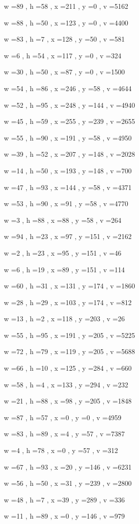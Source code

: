 \documentclass[11pt]{article}
\begin{document}
w =89 , h =58 , x =211 , y =0 , v =5162
\par
w =88 , h =50 , x =123 , y =0 , v =4400
\par
w =83 , h =7 , x =128 , y =50 , v =581
\par
w =6 , h =54 , x =117 , y =0 , v =324
\par
w =30 , h =50 , x =87 , y =0 , v =1500
\par
w =54 , h =86 , x =246 , y =58 , v =4644
\par
w =52 , h =95 , x =248 , y =144 , v =4940
\par
w =45 , h =59 , x =255 , y =239 , v =2655
\par
w =55 , h =90 , x =191 , y =58 , v =4950
\par
w =39 , h =52 , x =207 , y =148 , v =2028
\par
w =14 , h =50 , x =193 , y =148 , v =700
\par
w =47 , h =93 , x =144 , y =58 , v =4371
\par
w =53 , h =90 , x =91 , y =58 , v =4770
\par
w =3 , h =88 , x =88 , y =58 , v =264
\par
w =94 , h =23 , x =97 , y =151 , v =2162
\par
w =2 , h =23 , x =95 , y =151 , v =46
\par
w =6 , h =19 , x =89 , y =151 , v =114
\par
w =60 , h =31 , x =131 , y =174 , v =1860
\par
w =28 , h =29 , x =103 , y =174 , v =812
\par
w =13 , h =2 , x =118 , y =203 , v =26
\par
w =55 , h =95 , x =191 , y =205 , v =5225
\par
w =72 , h =79 , x =119 , y =205 , v =5688
\par
w =66 , h =10 , x =125 , y =284 , v =660
\par
w =58 , h =4 , x =133 , y =294 , v =232
\par
w =21 , h =88 , x =98 , y =205 , v =1848
\par
w =87 , h =57 , x =0 , y =0 , v =4959
\par
w =83 , h =89 , x =4 , y =57 , v =7387
\par
w =4 , h =78 , x =0 , y =57 , v =312
\par
w =67 , h =93 , x =20 , y =146 , v =6231
\par
w =56 , h =50 , x =31 , y =239 , v =2800
\par
w =48 , h =7 , x =39 , y =289 , v =336
\par
w =11 , h =89 , x =0 , y =146 , v =979
\par
\newpage
\end{document}
